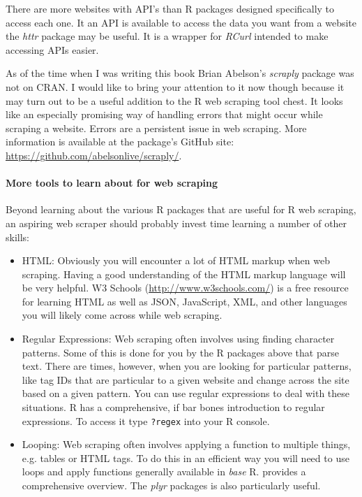 There are more websites with API's than R packages designed specifically to access each one. It an API is available to access the data you want from a website the \emph{httr} package \citep{R-httr}  may be useful. It is a wrapper for \emph{RCurl} intended to make accessing APIs easier. 

As of the time when I was writing this book Brian Abelson's \emph{scraply}  package was not on CRAN. I would like to bring your attention to it now though because it may turn out to be a useful addition to the R web scraping tool chest. It looks like an especially promising way of handling errors that might occur while scraping a website. Errors are a persistent issue in web scraping. More information is available at the package's GitHub site: \url{https://github.com/abelsonlive/scraply/}.

\paragraph{More tools to learn about for web scraping}

Beyond learning about the various R packages that are useful for R web scraping, an aspiring web scraper should probably invest time learning a number of other skills:

\begin{itemize}
	\item HTML: Obviously you will encounter a lot of HTML markup when web scraping. Having a good understanding of the HTML markup language will be very helpful. W3 Schools (\url{http://www.w3schools.com/}) is a free resource for learning HTML as well as JSON, JavaScript, XML, and other languages you will likely come across while web scraping.
	\item Regular Expressions: Web scraping often involves using finding character patterns. Some of this is done for you by the R packages above that parse text. There are times, however, when you are looking for particular patterns, like tag IDs that are particular to a given website and change across the site based on a given pattern. You can use regular expressions to deal with these situations. R has a comprehensive, if bar bones introduction to regular expressions. To access it type \verb|?regex| into your R console.
	\item Looping: Web scraping often involves applying a function to multiple things, e.g. tables or HTML tags. To do this in an efficient way you will need to use loops and apply functions generally available in \emph{base} R. \cite{Matloff2011} provides a comprehensive overview. The \emph{plyr} packages \citep{R-plyr} is also particularly useful.
\end{itemize}

